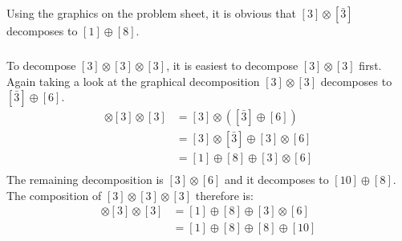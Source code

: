 \documentclass[exb,en]{exercise_5.0}
\begin{document}
\subsection{}
\subsubsection{}
Using the graphics on the problem sheet, it is obvious that 
$[3]\otimes[\bar 3]$ decomposes to $[1]\oplus [8]$. 

\subsubsection{}
To decompose $[3]\otimes [3]\otimes[3]$, it is easiest to decompose $[3]\otimes[3]$ first. Again taking a look at the graphical decomposition $[3]\otimes[3]$ decomposes to $[\bar 3]\oplus[6]$. 
\begin{align*}
    [3]\otimes[3]\otimes[3] 
    &= [3]\otimes([\bar 3]\oplus[6])\\
    &= [3]\otimes[\bar 3]\oplus[3]\otimes[6]\\
    &= [1]\oplus[8]\oplus[3]\otimes[6]\\
\end{align*}
The remaining decomposition is $[3]\otimes[6]$ and it decomposes to $[10]\oplus[8]$. The composition of $[3]\otimes [3]\otimes[3]$ therefore is:
\begin{align*}
    [3]\otimes[3]\otimes[3] 
    &= [1]\oplus[8]\oplus[3]\otimes[6]\\
    &= [1]\oplus[8]\oplus[8]\oplus[10]
\end{align*}

\subsection{}

\end{document}
